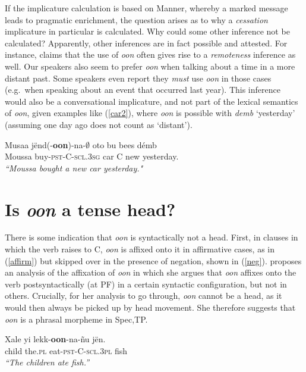 \documentclass[output=paper
,modfonts
,nonflat]{langsci/langscibook}
\begin{document}
If the implicature calculation is based on Manner, whereby a marked message leads to pragmatic enrichment, the question arises as to why a \textit{cessation} implicature in particular is calculated. Why  could some other inference not be calculated? Apparently, other inferences are in fact possible and attested. For instance, \citet{church81systeme} claims that the use of \textit{oon}
often gives rise to a \textit{remoteness} inference as well. Our speakers also seem to prefer \textit{oon} when talking about a time in a more distant past. Some speakers even report they \textit{must} use \textit{oon} in those cases (e.g.~when speaking about an event that occurred last year). This inference would also be a conversational implicature, and not part of the lexical semantics of \textit{oon}, given examples like (\ref{car2}), where \textit{oon} is possible with \textit{demb} `yesterday' (assuming one day ago does not count as `distant').

\ea\label{car2}
\gll Musaa j\"end(-\textbf{oon})-na-$\emptyset$ oto bu bees d\'emb \\
Moussa buy\textsc{-pst-C-scl.3sg} car C new yesterday. \\
\glt \textit{``Moussa bought a new car yesterday."} 
\z



\section{Is \textit{oon} a tense head?}

There is some indication that \textit{oon} is syntactically not a
head. First, in clauses in which the verb raises to C, \textit{oon} is
affixed onto it in affirmative cases, as in (\ref{affirm}) but skipped over in the presence
of negation, shown in (\ref{neg}). \cite{Martinovic2015b, Martinovic2016a} proposes an
analysis of the affixation of \textit{oon} in which she argues that
\textit{oon} affixes onto
the verb postsyntactically (at PF) in a certain syntactic
configuration, but not in others. Crucially, for her analysis to go
through, \textit{oon} cannot be a head, as it would then always be
picked up by head movement. She therefore suggests that \textit{oon}
is a phrasal morpheme in Spec,TP.


  
\ea
\gll Xale yi lekk-\textbf{oon}-na-\~nu j\"en.\\
child the.\textsc{pl} eat-\textsc{pst-C-scl.3pl} fish\\
\glt \textit{``The children ate fish.''}\label{affirm}
\z
\end{document}
